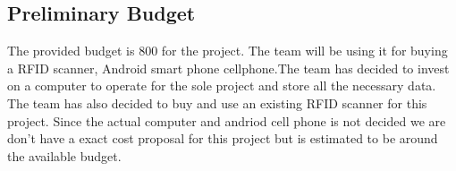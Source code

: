 \subsection{Preliminary Budget}
The provided budget is 800 for the project. The team will be using it for buying a RFID scanner, Android smart phone cellphone.The team has decided to invest on a computer to operate for the sole project and store all the necessary data. The team has also decided to buy and use an existing RFID scanner for this project. Since the actual computer and andriod cell phone is not decided we are don't have a exact cost proposal for this project but is estimated to be around the available budget.
